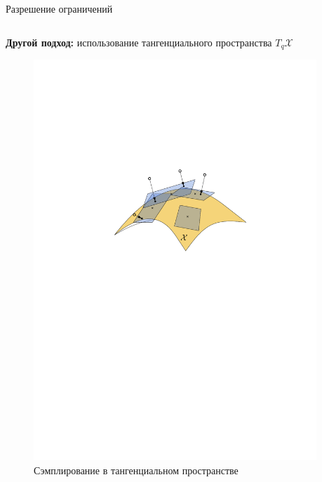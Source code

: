 \documentclass[11pt, aspectratio=169]{beamer}
\begin{document}
\begin{frame}{Разрешение ограничений}
    \begin{columns}[onlytextwidth]
        \begin{column}{0.4\textwidth}
            \textbf{Другой подход:} использование тангенциального пространства $T_q\mathcal{X}$
            \begin{figure}
                \centering
                \includegraphics[width=1.0\textwidth]{figures/graph/tb_sampling.pdf}
                \caption{Сэмплирование в тангенциальном пространстве}
                \label{fig:tb_sampling}
            \end{figure}
        \end{column}
        \begin{column}{0.58\textwidth}
            \leavevmode {}
\end{column}
\end{columns}
\end{frame}
\end{document}
